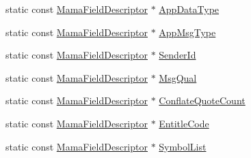 \begin{DoxyCompactItemize}
\item 
static const \hyperlink{classWombat_1_1MamaFieldDescriptor}{MamaFieldDescriptor} $\ast$ \hyperlink{classWombat_1_1MamaReservedFields_aa50d879ffe055bae5714419dfb5e4386}{AppDataType}
\item 
static const \hyperlink{classWombat_1_1MamaFieldDescriptor}{MamaFieldDescriptor} $\ast$ \hyperlink{classWombat_1_1MamaReservedFields_aa9dabe06499090efb80fe179dc16e677}{AppMsgType}
\item 
static const \hyperlink{classWombat_1_1MamaFieldDescriptor}{MamaFieldDescriptor} $\ast$ \hyperlink{classWombat_1_1MamaReservedFields_a2ab4cbfb056eb7043cb0c3bbb91b06c5}{SenderId}
\item 
static const \hyperlink{classWombat_1_1MamaFieldDescriptor}{MamaFieldDescriptor} $\ast$ \hyperlink{classWombat_1_1MamaReservedFields_a8fc4203af2f0a35f1371ec02c2ec2aea}{MsgQual}
\item 
static const \hyperlink{classWombat_1_1MamaFieldDescriptor}{MamaFieldDescriptor} $\ast$ \hyperlink{classWombat_1_1MamaReservedFields_afcb05ec0a59c5e50608d787c8e057a3f}{ConflateQuoteCount}
\item 
static const \hyperlink{classWombat_1_1MamaFieldDescriptor}{MamaFieldDescriptor} $\ast$ \hyperlink{classWombat_1_1MamaReservedFields_af8cbecbbd3886411ba556154f56772b3}{EntitleCode}
\item 
static const \hyperlink{classWombat_1_1MamaFieldDescriptor}{MamaFieldDescriptor} $\ast$ \hyperlink{classWombat_1_1MamaReservedFields_a64868fe7c909e5ca88c864e3824ab505}{SymbolList}
\end{DoxyCompactItemize}


